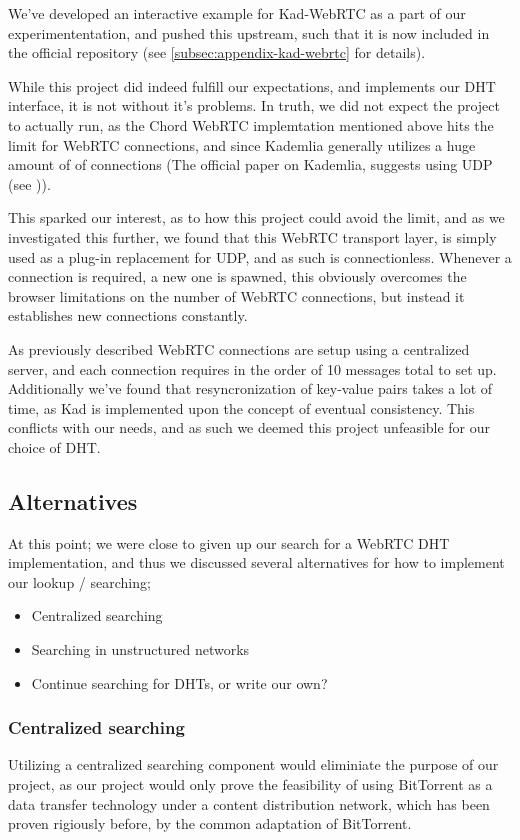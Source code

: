 We've developed an interactive example for Kad-WebRTC as a part of our
experimententation, and pushed this upstream, such that it is now included in 
the official repository (see \ref{subsec:appendix-kad-webrtc} for details).

While this project did indeed fulfill our expectations, and implements our DHT
interface, it is not without it's problems. In truth, we did not expect the 
project to actually run, as the Chord WebRTC implemtation mentioned above hits
the limit for WebRTC connections, and since Kademlia generally utilizes a huge
amount of of connections (The official paper on Kademlia, suggests using UDP
(see \citep{Maymounkov:Kademlia})).

This sparked our interest, as to how this project could avoid the limit, and as
we investigated this further, we found that this WebRTC transport layer, is
simply used as a plug-in replacement for UDP, and as such is connectionless.
Whenever a connection is required, a new one is spawned, this obviously
overcomes the browser limitations on the number of WebRTC connections, but 
instead it establishes new connections constantly.

As previously described WebRTC connections are setup using a centralized server,
and each connection requires in the order of 10 messages total to set up.
Additionally we've found that resyncronization of key-value pairs takes a lot
of time, as Kad is implemented upon the concept of eventual consistency. This
conflicts with our needs, and as such we deemed this project unfeasible for
our choice of DHT.

\subsection{Alternatives}
At this point; we were close to given up our search for a WebRTC DHT
implementation, and thus we discussed several alternatives for how to
implement our lookup / searching;
\begin{itemize}
\item Centralized searching
\item Searching in unstructured networks
\item Continue searching for DHTs, or write our own?
\end{itemize}

\subsubsection{Centralized searching}
Utilizing a centralized searching component would eliminiate the purpose of our
project, as our project would only prove the feasibility of using BitTorrent as
a data transfer technology under a content distribution network, which has been
proven rigiously before, by the common adaptation of BitTorrent.

